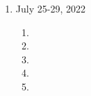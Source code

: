 \begin{enumerate}[label=Week \arabic*]
\begin{enumerate}[label=Day \arabic*]
		\item 
		\item 
		\item 
	\end{enumerate}
	\item July 25-29, 2022 
	\begin{enumerate}[label=Day \arabic*]
		\item 
		\item 
		\item 
		\item 
		\item 
	\end{enumerate}
\end{enumerate}
